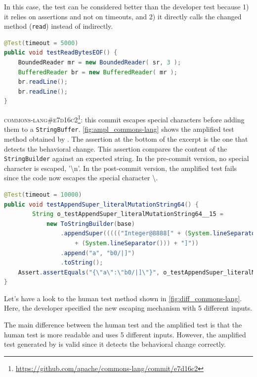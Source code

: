 In this case, the \DCI test can be considered better than the developer test because
1) it relies on assertions and not on timeouts, and
2) it directly calls the changed method (\texttt{read}) instead of indirectly. 

\begin{lstlisting}[float,language=java,caption=Developer test for commit \textsc{81210eb} of commons-io.,label=fig:diff_commons-io]
@Test(timeout = 5000)
public void testReadBytesEOF() {
	BoundedReader mr = new BoundedReader( sr, 3 );
	BufferedReader br = new BufferedReader( mr );
	br.readLine();
	br.readLine();
}
\end{lstlisting}

\textsc{commons-lang\#e7d16c2}\footnote{\url{https://github.com/apache/commons-lang/commit/e7d16c2}}: this commit escapes special characters before adding them to a \texttt{StringBuffer}.
\autoref{fig:ampl_commons-lang} shows the amplified test method obtained by \DCII.
The assertion at the bottom of the excerpt is the one that detects the behavioral change.
This assertion compares the content of the \texttt{StringBuilder} against an expected string.
In the pre-commit version, no special character is escaped, \eg '\textbackslash n'.
In the post-commit version, the amplified test fails since the code now escapes the special character \textbackslash.

\begin{lstlisting}[float,language=java,caption=Test generated by \DCII that detects the behavioral change of \textsc{e7d16c2} in commons-lang.,label=fig:ampl_commons-lang]
@Test(timeout = 10000)
public void testAppendSuper_literalMutationString64() {
		String o_testAppendSuper_literalMutationString64__15 = 
			new ToStringBuilder(base)
				.appendSuper((((("Integer@8888[" + (System.lineSeparator())) + "  null") 
					+ (System.lineSeparator())) + "]"))
				.append("a", "b0/|]")
				.toString();
	Assert.assertEquals("{\"a\":\"b0/|]\"}", o_testAppendSuper_literalMutationString64__15);
}
\end{lstlisting}

Let's have a look to the human test method shown in \autoref{fig:diff_commons-lang}.
Here, the developer specified the new escaping mechanism with 5 different inputs.

The main difference between the human test and the amplified test is that the human test is more readable and uses 5 different inputs.
However, the amplified test generated by \DCI is valid since it detects the behavioral change correctly.

